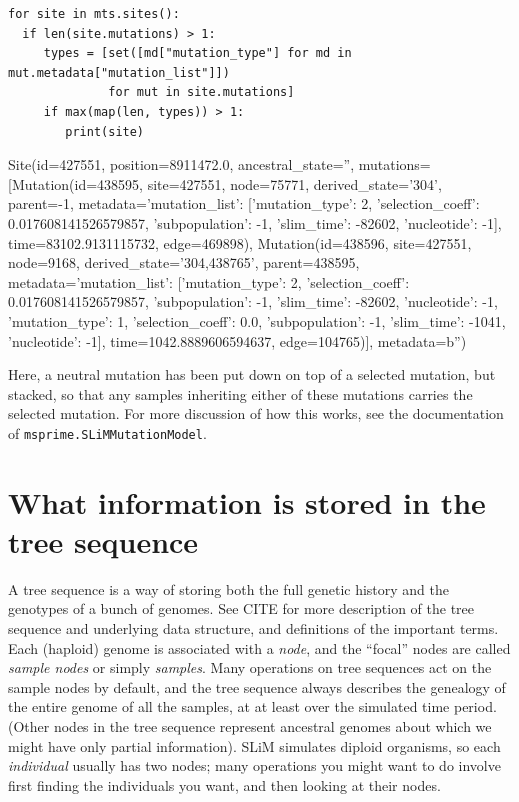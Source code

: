 \documentclass[12pt]{article}
\begin{document}
\begin{listing}[H]
    \begin{verbatim}
for site in mts.sites():
  if len(site.mutations) > 1:
     types = [set([md["mutation_type"] for md in mut.metadata["mutation_list"]])
              for mut in site.mutations]
     if max(map(len, types)) > 1:
        print(site)
    \end{verbatim}
\end{listing}
\begin{pycon}
Site(id=427551, position=8911472.0, ancestral_state='', mutations=[Mutation(id=438595, site=427551, node=75771, derived_state='304', parent=-1, metadata={'mutation_list': [{'mutation_type': 2, 'selection_coeff': 0.017608141526579857, 'subpopulation': -1, 'slim_time': -82602, 'nucleotide': -1}]}, time=83102.9131115732, edge=469898), Mutation(id=438596, site=427551, node=9168, derived_state='304,438765', parent=438595, metadata={'mutation_list': [{'mutation_type': 2, 'selection_coeff': 0.017608141526579857, 'subpopulation': -1, 'slim_time': -82602, 'nucleotide': -1}, {'mutation_type': 1, 'selection_coeff': 0.0, 'subpopulation': -1, 'slim_time': -1041, 'nucleotide': -1}]}, time=1042.8889606594637, edge=104765)], metadata=b'')
\end{pycon}

Here, a neutral mutation has been put down on top of a selected mutation, but stacked,
so that any samples inheriting either of these mutations carries the selected mutation.
For more discussion of how this works, see  the documentation of \verb|msprime.SLiMMutationModel|.

\section*{What information is stored in the tree sequence}

A tree sequence is a way of storing both the full genetic history and the genotypes
of a bunch of genomes.
See CITE
for more description of the tree sequence and underlying data structure,
and definitions of the important terms.
Each (haploid) genome is associated with a \textit{node},
and the ``focal'' nodes are called \textit{sample nodes} or simply \textit{samples}.
Many operations on tree sequences act on the sample nodes by default,
and the tree sequence always describes the genealogy of the
entire genome of all the samples, at at least over the simulated time period.
(Other nodes in the tree sequence represent ancestral genomes
about which we might have only partial information).
SLiM simulates diploid organisms, so each \textit{individual} usually has two nodes;
many operations you might want to do involve first finding the individuals you want,
and then looking at their nodes.
\end{document}
